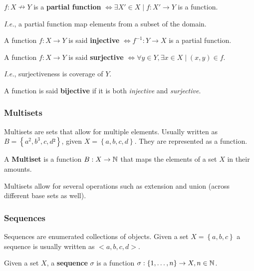 \begin{definition}
	$f:X\nrightarrow Y$ is a \textbf{partial function} $\iff \exists X' \in X \mid f:X'\to Y$ is a function.
\end{definition}

\emph{I.e.}, a partial function map elements from a subset of the domain.

\begin{remark}
	A function $f:X\to Y$ is said \textbf{injective} $\iff f^{-1}:Y\to X$ is a partial function.
\end{remark}

\begin{remark}
	A function $f:X\to Y$ is said \textbf{surjective} $\iff \forall y \in Y, \exists x \in X \mid \left( x, y \right) \in f $.
\end{remark}

\emph{I.e.}, surjectiveness is coverage of $Y$.

 \begin{remark}
	A function is said \textbf{bijective} if it is both \emph{injective} and \emph{surjective}.
\end{remark}

\subsubsection*{Multisets}

Multisets are sets that allow for multiple elements. Usually written as $B = \left\{ a^{2}, b^{3}, c, d² \right\} $, given $X = \left\{ a, b, c, d \right\} $. They are represented as a function.

\begin{definition}
	A \textbf{Multiset} is a function $B:X\to \mathbb{N}$ that maps the elements of a set $X$ in their amounts.
\end{definition}

Multisets allow for several operations such as extension and union (across different base sets as well).

\subsubsection*{Sequences}

Sequences are enumerated collections of objects. Given a set $X= \left\{ a, b, c \right\} $ a sequence is usually written as $ <a,b,c,d>$.

\begin{definition}
	Given a set $X$, a \textbf{sequence} $ \sigma$ is a function  $\sigma:\left\{ 1,\ldots,n \right\} \to X, n \in \mathbb{N}$.
\end{definition}

